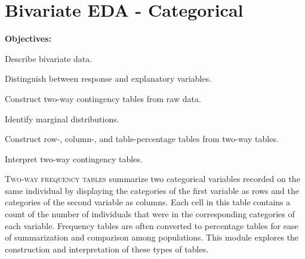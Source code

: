\documentclass[10pt,openany]{book}\usepackage[]{graphicx}\usepackage[]{color}
\begin{document}
\chapter{Bivariate EDA - Categorical} \label{chap:BivEDACat}
\begin{ChapObj}{\boxwidth}
  \textbf{Objectives:}
  \begin{Enumerate}
    \item Describe bivariate data.
    \item Distinguish between response and explanatory variables.
    \item Construct two-way contingency tables from raw data.
    \item Identify marginal distributions.
    \item Construct row-, column-, and table-percentage tables from two-way tables.
    \item Interpret two-way contingency tables.
  \end{Enumerate}
\end{ChapObj}

\minitoc
\vspace{48pt}

\lettrine{T}{wo-way frequency tables} summarize two categorical variables recorded on the same individual by displaying the categories of the first variable as rows and the categories of the second variable as columns.  Each cell in this table contains a count of the number of individuals that were in the corresponding categories of each variable.  Frequency tables are often converted to percentage tables for ease of summarization and comparison among populations.  This module explores the construction and interpretation of these types of tables.
\end{document}
